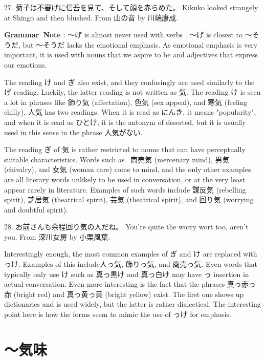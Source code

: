 \par{27. 菊子は不審げに信吾を見て、そして顔を赤らめた。 \hfill\break
Kikuko looked strangely at Shingo and then blushed. \hfill\break
From 山の音 by 川端康成. }
 
\par{\textbf{Grammar Note }: ～げ is almost never used with verbs . ～げ is closest to ～そうだ, but ～そうだ lacks the emotional emphasis. As emotional emphasis is very important, it is used with nouns that we aspire to be and adjectives that express our emotions. }

\par{ The reading け and ぎ also exist, and they confusingly are used similarly to the げ reading. Luckily, the latter reading is not written as 気. The reading け is seen a lot in phrases like 飾り気 (affectation), 色気 (sex appeal), and 寒気 (feeling chilly). 人気 has two readings. When it is read as にんき, it means "popularity", and when it is read as ひとけ, it is the antonym of deserted, but it is usually used in this sense in the phrase 人気がない.  }

\par{ The reading ぎ of 気 is rather restricted to nouns that can have perceptually suitable characteristics. Words such as  商売気 (mercenary mind), 男気 (chivalry), and 女気 (woman care) come to mind, and the only other examples are all literary words unlikely to be used in conversation, or at the very least appear rarely in literature. Examples of such words include 謀反気 (rebelling spirit), 芝居気 (theatrical spirit), 芸気 (theatrical spirit), and 回り気 (worrying and doubtful spirit). }

\par{28. お前さんも余程回り気の人だね。 \hfill\break
You're quite the worry wort too, aren't you.  \hfill\break
From 深川女房 by 小栗風葉. }

\par{ Interestingly enough, the most common examples of ぎ and け are replaced with っけ. Examples of this include人っ気, 飾りっ気, and 商売っ気. Even words that typically only use け such as 真っ黒け and 真っ白け may have っ insertion in actual conversation. Even more interesting is the fact that the phrases 真っ赤っ赤 (bright red) and 真っ黄っ黄 (bright yellow) exist. The first one shows up dictionaries and is used widely, but the latter is rather dialectical. The interesting point here is how the forms seem to mimic the use of っけ for emphasis. }
      
\section{～気味}
 
